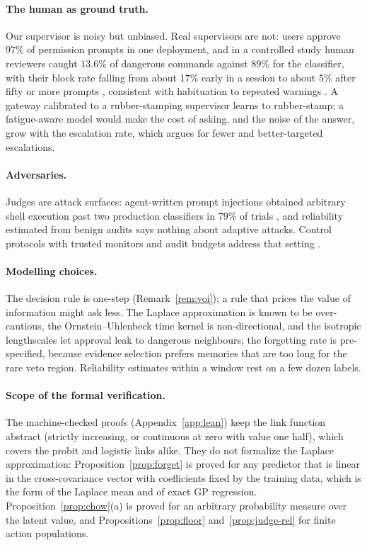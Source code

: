\documentclass[11pt]{article}
\begin{document}
\paragraph{The human as ground truth.} Our supervisor is noisy but unbiased.
Real supervisors are not: users approve $97\%$ of permission prompts in one
deployment, and in a controlled study human reviewers caught $13.6\%$ of
dangerous commands against $89\%$ for the classifier, with their block rate
falling from about $17\%$ early in a session to about $5\%$ after fifty or more
prompts \citep{phillippi2026automodedefault}, consistent with habituation to
repeated warnings \citep{anderson2015polymorphic}. A gateway calibrated to a
rubber-stamping supervisor learns to rubber-stamp; a fatigue-aware model would
make the cost of asking, and the noise of the answer, grow with the escalation
rate, which argues for fewer and better-targeted escalations.

\paragraph{Adversaries.} Judges are attack surfaces: agent-written prompt
injections obtained arbitrary shell execution past two production classifiers
in $79\%$ of trials \citep{remedios2026redteaming}, and reliability estimated
from benign audits says nothing about adaptive attacks. Control protocols with
trusted monitors and audit budgets address that setting
\citep{greenblatt2024control,bhatt2025ctrlz}.

\paragraph{Modelling choices.} The decision rule is one-step
(Remark~\ref{rem:voi}); a rule that prices the value of information might ask
less. The Laplace approximation is known to be over-cautious, the
Ornstein--Uhlenbeck time kernel is non-directional, and the isotropic
lengthscales let approval leak to dangerous neighbours; the forgetting rate is
pre-specified, because evidence selection prefers memories that are too long
for the rare veto region. Reliability estimates within a window rest on a few
dozen labels.

\paragraph{Scope of the formal verification.} The machine-checked proofs
(Appendix~\ref{app:lean}) keep the link function abstract (strictly
increasing, or continuous at zero with value one half), which covers the
probit and logistic links alike. They do not formalize the Laplace
approximation: Proposition~\ref{prop:forget} is proved for any predictor that
is linear in the cross-covariance vector with coefficients fixed by the
training data, which is the form of the Laplace mean and of exact GP
regression. Proposition~\ref{prop:chow}(a) is proved for an arbitrary
probability measure over the latent value, and
Propositions~\ref{prop:floor} and~\ref{prop:judge-rel} for finite action
populations.
\end{document}
